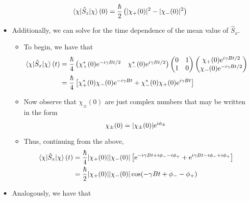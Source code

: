 \documentclass[../notes.tex]{subfiles}
\begin{document}
\begin{itemize}
    \begin{equation*}
        \ev{\hat{S}_z}{\chi}(0) = \frac{\hbar}{2}\left( |\chi_+(0)|^2-|\chi_-(0)|^2 \right)
    \end{equation*}
    \item Additionally, we can solve for the time dependence of the mean value of $\hat{S}_x$.
    \begin{itemize}
        \item To begin, we have that
        \begin{align*}
            \ev{\hat{S}_x}{\chi}(t) &= \frac{\hbar}{4}
            \begin{pmatrix}
                \chi_+^*(0)\e[-i\gamma Bt/2] & \chi_-^*(0)\e[i\gamma Bt/2]\\
            \end{pmatrix}
            \begin{pmatrix}
                0 & 1\\
                1 & 0\\
            \end{pmatrix}
            \begin{pmatrix}
                \chi_+(0)\e[i\gamma Bt/2]\\
                \chi_-(0)\e[-i\gamma Bt/2]\\
            \end{pmatrix}\\
            &= \frac{\hbar}{4}\left[ \chi_+^*(0)\chi_-(0)\e[-i\gamma Bt]+\chi_-^*(0)\chi_+(0)\e[i\gamma Bt] \right]
        \end{align*}
        \item Now observe that $\chi_\pm(0)$ are just complex numbers that may be written in the form
        \begin{equation*}
            \chi_\pm(0) = |\chi_\pm(0)|\e[i\phi_\pm]
        \end{equation*}
        \item Thus, continuing from the above,
        \begin{align*}
            \ev{\hat{S}_x}{\chi}(t) &= \frac{\hbar}{4}|\chi_+(0)||\chi_-(0)|\left[ \e[-i\gamma Bt+i\phi_--i\phi_+]+\e[i\gamma Bt-i\phi_-+i\phi_+] \right]\\
            &= \frac{\hbar}{2}|\chi_+(0)||\chi_-(0)|\cos(-\gamma Bt+\phi_--\phi_+)
        \end{align*}
    \end{itemize}
    \item Analogously, we have that
    \begin{equation*}

\end{equation*}
\end{itemize}
\end{document}
